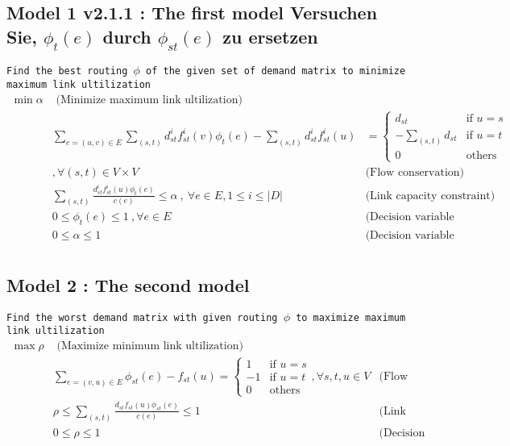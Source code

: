 \documentclass{ctexart}
\begin{document}
\subsection{Model 1 v2.1.1 : The first model Versuchen Sie, $\phi_t(e)$ durch $\phi_{st}(e)$ zu ersetzen}
\texttt{Find the best routing $\phi$ of the given set of demand matrix to minimize maximum link ultilization} 
\begin{equation}
	\begin{aligned}
		\min \alpha & \text{  (Minimize maximum link ultilization)}\\
		& \sum_{e=(u,v)\in E}\sum_{(s,t)}d_{st}^if_{st}^i(v)\phi_{t}(e)-\sum_{(s,t)}d_{st}^if_{st}^i(u) & =\begin{cases}
			d_{st} &\text{if } u=s \\
			-\sum_{(s,t)}d_{st} &\text{if } u=t \\
			0 &\text{others} 
		 \end{cases}\\
		&, \forall (s,t)\in V\times V & \text{(Flow conservation)}\\
		& \sum_{(s,t)}\frac{
			d_{st}^if_{st}^i(u)\phi_{t}(e)}{c(e)} \leq \alpha\ ,\ \forall e\in E,1\leq i\leq|\textit{D}| &  \text{(Link capacity constraint)} \\
		& 0\leq\phi_{t}(e)\leq1\ ,\forall e\in E\ & \text{(Decision variable constraint)}\\
		& 0\leq\alpha\leq1\ & \text{(Decision variable constraint)} \\
	\end{aligned}
\end{equation}

\subsection{Model 2 : The second model}
\texttt{Find the worst demand matrix with given routing $\phi$  to maximize maximum link ultilization} 
\begin{equation}
	\begin{aligned}
		\max \rho & \text{  (Maximize minimum link ultilization)}\\
		& \sum_{e=(v,u)\in E}\phi_{st}(e)-f_{st}(u)=\begin{cases}
			1 &\text{if } u=s \\
			-1 &\text{if } u=t \\
			0 &\text{others} 
		 \end{cases},\forall s,t,u\in V & \text{(Flow conservation)}\\
		& \rho\leq\sum_{(s,t)}\frac{
			d_{st}f_{st}(u)\phi_{st}(e)}{c(e)} \leq 1\ &  \text{(Link capacity constraint)} \\
		& 0\leq\rho\leq1\ & \text{(Decision variable constraint)}
	\end{aligned}
\end{equation}
\end{document}
